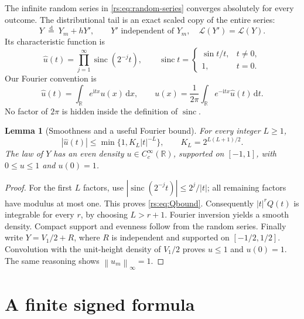 \documentclass[11pt,a4paper,oneside,openany]{book}
\numberwithin{equation}{chapter}
\newtheorem{lemma}[theorem]{Lemma}
\theoremstyle{definition}
\theoremstyle{remark}
\newcommand{\R}{\mathbb R}
\newcommand{\dd}{\,\mathrm d}
\newcommand{\ii}{\mathrm i}
\newcommand{\norm}[1]{\left\lVert #1\right\rVert}
\DeclareMathOperator{\sinc}{sinc}
\newcommand{\Law}{\mathcal L}
\begin{document}
The infinite random series in \eqref{rs:eq:random-series} converges
absolutely for every outcome. The distributional tail is an exact
scaled copy of the entire series:
\begin{equation}
 Y\ \overset{\mathrm d}=\ Y_m+hY',
 \qquad Y'\text{ independent of }Y_m,\quad \Law(Y')=\Law(Y).
 \label{rs:eq:tail-law}
\end{equation}
Its characteristic function is
\begin{equation}
 \widehat u(t)=\prod_{j=1}^{\infty}\sinc(2^{-j}t),\qquad
 \sinc t=\begin{cases}\sin t/t,&t\ne0,\\1,&t=0.\end{cases}
 \label{rs:eq:Q}
\end{equation}
Our Fourier convention is
\begin{equation}
 \widehat u(t)=\int_{\R}e^{\ii tx}u(x)\dd x,
 \qquad
 u(x)=\frac1{2\pi}\int_{\R}e^{-\ii tx}\widehat u(t)\dd t.
 \label{rs:eq:Fourier-convention}
\end{equation}
No factor of $2\pi$ is hidden inside the definition of $\sinc$.

\begin{lemma}[Smoothness and a useful Fourier bound]\label{rs:lem:decay}
For every integer $L\geq1$,
\begin{equation}
 |\widehat u(t)|\leq\min\{1,K_L|t|^{-L}\},
 \qquad K_L=2^{L(L+1)/2}.
 \label{rs:eq:Qbound}
\end{equation}
The law of $Y$ has an even density $u\in C_c^\infty(\R)$, supported
on $[-1,1]$, with $0\leq u\leq1$ and $u(0)=1$.
\end{lemma}
\begin{proof}
For the first $L$ factors, use
$|\sinc(2^{-j}t)|\leq2^j/|t|$; all remaining factors have modulus
at most one. This proves \eqref{rs:eq:Qbound}. Consequently
$|t|^rQ(t)$ is integrable for every $r$, by choosing $L>r+1$.
Fourier inversion yields a smooth density. Compact support and evenness
follow from the random series. Finally write $Y=V_1/2+R$, where
$R$ is independent and supported on $[-1/2,1/2]$. Convolution with the
unit-height density of $V_1/2$ proves $u\leq1$ and $u(0)=1$.
The same reasoning shows $\norm{u_m}_\infty=1$.
\end{proof}

\section{A finite signed formula}
\end{document}
